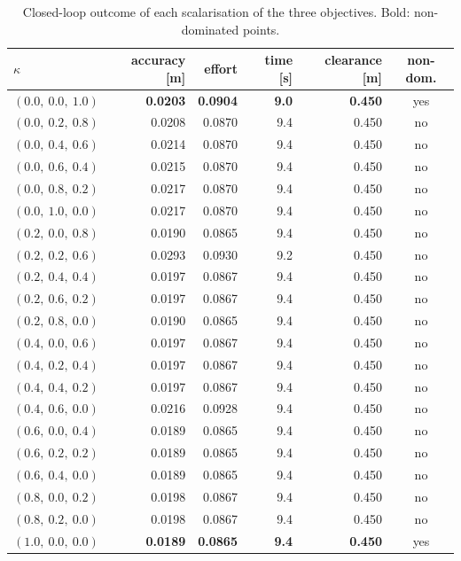 \begin{table}[htbp]
  \centering
  \small
  \caption{Closed-loop outcome of each scalarisation of the three objectives. Bold: non-dominated points.}
  \label{res:tab:pareto}
  \begin{tabular}{lrrrrc}
    \toprule
    $\kappa$ & accuracy [m] & effort & time [s] & clearance [m] & non-dom. \\
    \midrule
    $(0.0,\ 0.0,\ 1.0)$ & \textbf{0.0203} & \textbf{0.0904} & \textbf{9.0} & \textbf{0.450} & yes \\
    $(0.0,\ 0.2,\ 0.8)$ & 0.0208 & 0.0870 & 9.4 & 0.450 & no \\
    $(0.0,\ 0.4,\ 0.6)$ & 0.0214 & 0.0870 & 9.4 & 0.450 & no \\
    $(0.0,\ 0.6,\ 0.4)$ & 0.0215 & 0.0870 & 9.4 & 0.450 & no \\
    $(0.0,\ 0.8,\ 0.2)$ & 0.0217 & 0.0870 & 9.4 & 0.450 & no \\
    $(0.0,\ 1.0,\ 0.0)$ & 0.0217 & 0.0870 & 9.4 & 0.450 & no \\
    $(0.2,\ 0.0,\ 0.8)$ & 0.0190 & 0.0865 & 9.4 & 0.450 & no \\
    $(0.2,\ 0.2,\ 0.6)$ & 0.0293 & 0.0930 & 9.2 & 0.450 & no \\
    $(0.2,\ 0.4,\ 0.4)$ & 0.0197 & 0.0867 & 9.4 & 0.450 & no \\
    $(0.2,\ 0.6,\ 0.2)$ & 0.0197 & 0.0867 & 9.4 & 0.450 & no \\
    $(0.2,\ 0.8,\ 0.0)$ & 0.0190 & 0.0865 & 9.4 & 0.450 & no \\
    $(0.4,\ 0.0,\ 0.6)$ & 0.0197 & 0.0867 & 9.4 & 0.450 & no \\
    $(0.4,\ 0.2,\ 0.4)$ & 0.0197 & 0.0867 & 9.4 & 0.450 & no \\
    $(0.4,\ 0.4,\ 0.2)$ & 0.0197 & 0.0867 & 9.4 & 0.450 & no \\
    $(0.4,\ 0.6,\ 0.0)$ & 0.0216 & 0.0928 & 9.4 & 0.450 & no \\
    $(0.6,\ 0.0,\ 0.4)$ & 0.0189 & 0.0865 & 9.4 & 0.450 & no \\
    $(0.6,\ 0.2,\ 0.2)$ & 0.0189 & 0.0865 & 9.4 & 0.450 & no \\
    $(0.6,\ 0.4,\ 0.0)$ & 0.0189 & 0.0865 & 9.4 & 0.450 & no \\
    $(0.8,\ 0.0,\ 0.2)$ & 0.0198 & 0.0867 & 9.4 & 0.450 & no \\
    $(0.8,\ 0.2,\ 0.0)$ & 0.0198 & 0.0867 & 9.4 & 0.450 & no \\
    $(1.0,\ 0.0,\ 0.0)$ & \textbf{0.0189} & \textbf{0.0865} & \textbf{9.4} & \textbf{0.450} & yes \\
    \bottomrule
  \end{tabular}
\end{table}

